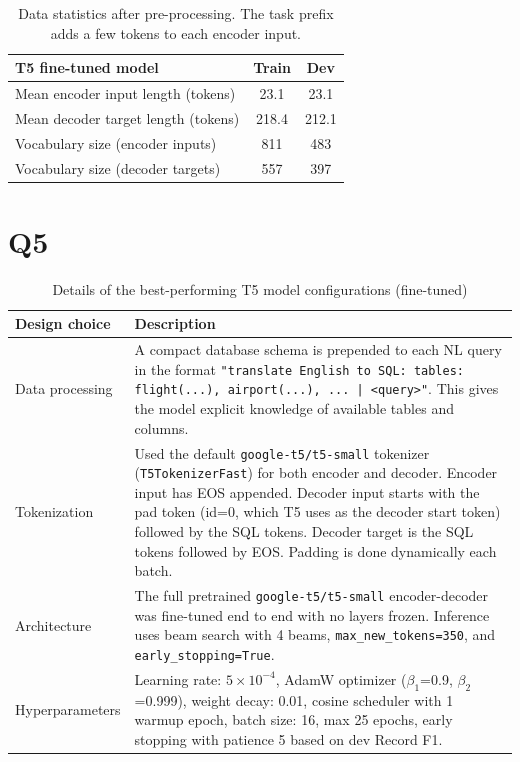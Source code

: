\documentclass{article}
\begin{document}
\begin{table}[h!]
\centering
\begin{tabular}{lcc}
\toprule
\textbf{T5 fine-tuned model} & Train & Dev \\
\midrule
Mean encoder input length (tokens) & 23.1 & 23.1 \\
Mean decoder target length (tokens) & 218.4 & 212.1 \\
Vocabulary size (encoder inputs) & 811 & 483 \\
Vocabulary size (decoder targets) & 557 & 397 \\
\midrule
\bottomrule
\end{tabular}
\caption{Data statistics after pre-processing. The task prefix adds a few tokens to each encoder input.}
\label{tab:data_stats_after}
\end{table}

\newpage

\section*{Q5}\label{sec:t5}

\begin{table}[h!]
\centering
\begin{tabular}{p{3.5cm}p{10cm}}
\toprule
Design choice & Description \\
\midrule
Data processing & A compact database schema is prepended to each NL query in the format \texttt{"translate English to SQL: tables: flight(...), airport(...), ... | <query>"}. This gives the model explicit knowledge of available tables and columns. \\
Tokenization & Used the default \texttt{google-t5/t5-small} tokenizer (\texttt{T5TokenizerFast}) for both encoder and decoder. Encoder input has EOS appended. Decoder input starts with the pad token (id=0, which T5 uses as the decoder start token) followed by the SQL tokens. Decoder target is the SQL tokens followed by EOS. Padding is done dynamically each batch. \\
Architecture & The full pretrained \texttt{google-t5/t5-small} encoder-decoder was fine-tuned end to end with no layers frozen. Inference uses beam search with 4 beams, \texttt{max\_new\_tokens=350}, and \texttt{early\_stopping=True}. \\
Hyperparameters & Learning rate: $5 \times 10^{-4}$, AdamW optimizer ($\beta_1$=0.9, $\beta_2$=0.999), weight decay: 0.01, cosine scheduler with 1 warmup epoch, batch size: 16, max 25 epochs, early stopping with patience 5 based on dev Record F1. \\
\bottomrule
\end{tabular}
\caption{Details of the best-performing T5 model configurations (fine-tuned)}
\label{tab:t5_results_ft}
\end{table}
\end{document}
